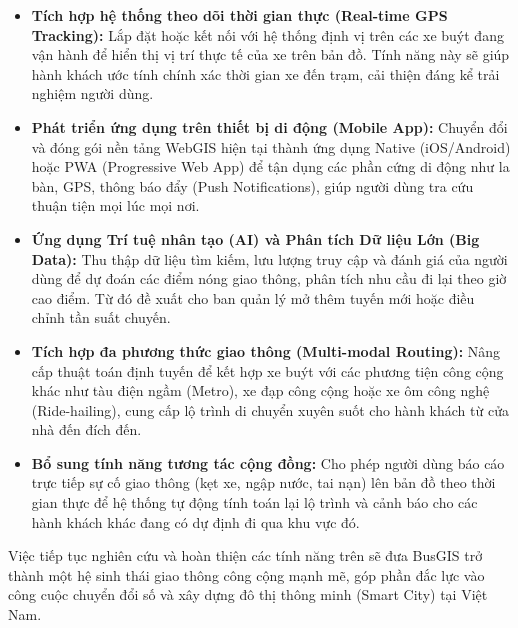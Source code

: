 \begin{itemize}
    \item \textbf{Tích hợp hệ thống theo dõi thời gian thực (Real-time GPS Tracking):} Lắp đặt hoặc kết nối với hệ thống định vị trên các xe buýt đang vận hành để hiển thị vị trí thực tế của xe trên bản đồ. Tính năng này sẽ giúp hành khách ước tính chính xác thời gian xe đến trạm, cải thiện đáng kể trải nghiệm người dùng.
    \item \textbf{Phát triển ứng dụng trên thiết bị di động (Mobile App):} Chuyển đổi và đóng gói nền tảng WebGIS hiện tại thành ứng dụng Native (iOS/Android) hoặc PWA (Progressive Web App) để tận dụng các phần cứng di động như la bàn, GPS, thông báo đẩy (Push Notifications), giúp người dùng tra cứu thuận tiện mọi lúc mọi nơi.
    \item \textbf{Ứng dụng Trí tuệ nhân tạo (AI) và Phân tích Dữ liệu Lớn (Big Data):} Thu thập dữ liệu tìm kiếm, lưu lượng truy cập và đánh giá của người dùng để dự đoán các điểm nóng giao thông, phân tích nhu cầu đi lại theo giờ cao điểm. Từ đó đề xuất cho ban quản lý mở thêm tuyến mới hoặc điều chỉnh tần suất chuyến.
    \item \textbf{Tích hợp đa phương thức giao thông (Multi-modal Routing):} Nâng cấp thuật toán định tuyến để kết hợp xe buýt với các phương tiện công cộng khác như tàu điện ngầm (Metro), xe đạp công cộng hoặc xe ôm công nghệ (Ride-hailing), cung cấp lộ trình di chuyển xuyên suốt cho hành khách từ cửa nhà đến đích đến.
    \item \textbf{Bổ sung tính năng tương tác cộng đồng:} Cho phép người dùng báo cáo trực tiếp sự cố giao thông (kẹt xe, ngập nước, tai nạn) lên bản đồ theo thời gian thực để hệ thống tự động tính toán lại lộ trình và cảnh báo cho các hành khách khác đang có dự định đi qua khu vực đó.
\end{itemize}

Việc tiếp tục nghiên cứu và hoàn thiện các tính năng trên sẽ đưa BusGIS trở thành một hệ sinh thái giao thông công cộng mạnh mẽ, góp phần đắc lực vào công cuộc chuyển đổi số và xây dựng đô thị thông minh (Smart City) tại Việt Nam.
